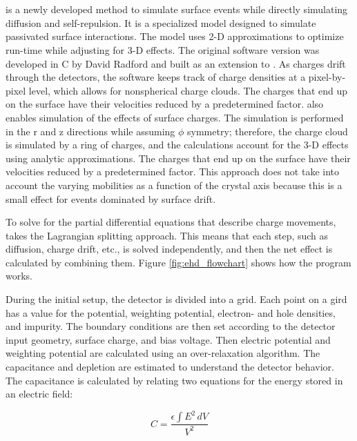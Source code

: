 \section{{\ehd}}
{\ehd} is a newly developed method to simulate surface events while directly simulating diffusion and self-repulsion. It is a specialized model designed to simulate passivated surface interactions. The model uses 2-D approximations to optimize run-time while adjusting for 3-D effects. The original software version was developed in C by David Radford and built as an extension to {\siggen}. As charges drift through the detectors, the software keeps track of charge densities at a pixel-by-pixel level, which allows for nonspherical charge clouds. The charges that end up on the surface have their velocities reduced by a predetermined factor. {\ehd} also enables simulation of the effects of surface charges. The simulation is performed in the r and z directions while assuming $\phi$ symmetry; therefore, the charge cloud is simulated by a ring of charges, and the calculations account for the 3-D effects using analytic approximations. The charges that end up on the surface have their velocities reduced by a predetermined factor. This approach does not take into account the varying mobilities as a function of the crystal axis because this is a small effect for events dominated by surface drift.

To solve for the partial differential equations that describe charge movements, {\ehd} takes the Lagrangian splitting approach. This means that each step, such as diffusion, charge drift, etc., is solved independently, and then the net effect is calculated by combining them. Figure \ref{fig:ehd_flowchart} shows how the {\ehd} program works. 

During the initial setup, the detector is divided into a grid. Each point on a gird has a value for the potential, weighting potential, electron- and hole densities, and impurity. The boundary conditions are then set according to the detector input geometry, surface charge, and bias voltage. Then electric potential and weighting potential are calculated using an over-relaxation algorithm. The capacitance and depletion are estimated to understand the detector behavior. The capacitance is calculated by relating two equations for the energy stored in an electric field:

\begin{equation}
    C = \frac{\epsilon \int E^2 \, dV}{V^2}
\end{equation}

